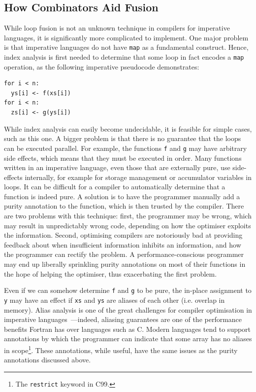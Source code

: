 \subsection{How Combinators Aid Fusion}

While loop fusion is not an unknown technique in compilers for
imperative languages, it is significantly more complicated to
implement.  One major problem is that imperative languages do not have
\lstinline{map} as a fundamental construct.  Hence, index analysis is
first needed to determine that some loop in fact encodes a
\lstinline{map} operation, as the following imperative pseudocode
demonstrates:

\begin{lstlisting}
for i < n:
  ys[i] <- f(xs[i])
for i < n:
  zs[i] <- g(ys[i])
\end{lstlisting}

While index analysis can easily become undecidable, it is feasible for
simple cases, such as this one.  A bigger problem is that there is no
guarantee that the loops can be executed parallel.  For example, the
functions \lstinline{f} and \lstinline{g} may have arbitrary side
effects, which means that they must be executed in order.  Many
functions written in an imperative language, even those that are
externally pure, use side-effects internally, for example for storage
management or accumulator variables in loops.  It can be difficult for
a compiler to automatically determine that a function is indeed pure.
A solution is to have the programmer manually add a purity annotation
to the function, which is then trusted by the compiler.  There are two
problems with this technique: first, the programmer may be wrong,
which may result in unpredictably wrong code, depending on how the
optimiser exploits the information.  Second, optimising compilers are
notoriously bad at providing feedback about when insufficient
information inhibits an information, and how the programmer can
rectify the problem.  A performance-conscious programmer may end up
liberally sprinkling purity annotations on most of their functions in
the hope of helping the optimiser, thus exacerbating the first
problem.

Even if we can somehow determine \lstinline{f} and \lstinline{g} to be
pure, the in-place assignment to \lstinline{y} may have an effect if
\lstinline{xs} and \lstinline{ys} are aliases of each other
(i.e. overlap in memory).  Alias analysis is one of the great
challenges for compiler optimisation in imperative
languages~\cite{hendren1992designing}---indeed, aliasing guarantees
are one of the performance benefits Fortran has over languages such as
C.  Modern languages tend to support annotations by which the
programmer can indicate that some array has no aliases in
scope\footnote{The \texttt{restrict} keyword in C99.}.  These
annotations, while useful, have the same issues as the purity
annotations discussed above.

